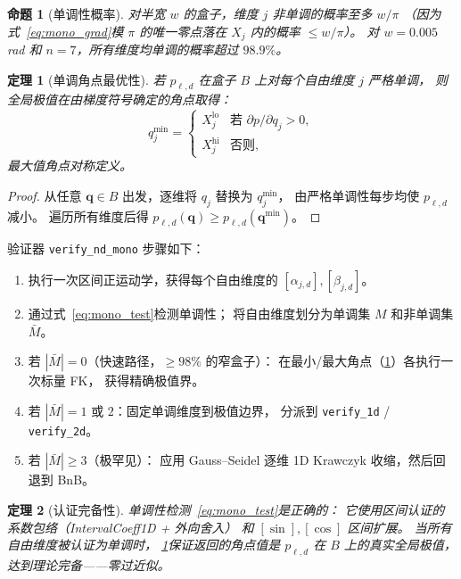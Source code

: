 \documentclass[journal]{IEEEtran}
\newtheorem{theorem}{定理}
\newtheorem{proposition}{命题}
\begin{document}
\begin{proposition}[单调性概率]\label{prop:mono_prob}
对半宽 $w$ 的盒子，维度 $j$ 非单调的概率至多 $w/\pi$
（因为式~\eqref{eq:mono_grad}模 $\pi$ 的唯一零点落在 $X_j$ 内的概率 $\leq w/\pi$）。
对 $w = 0.005$\,rad 和 $n = 7$，所有维度均单调的概率超过 $98.9\%$。
\end{proposition}

\begin{theorem}[单调角点最优性]\label{thm:mono_corner}
若 $p_{\ell,d}$ 在盒子 $B$ 上对每个自由维度 $j$ 严格单调，
则全局极值在由梯度符号确定的角点取得：
\begin{equation}\label{eq:corner}
  q_j^{\min} = \begin{cases}
    X_j^{\mathrm{lo}} & \text{若 } \partial p/\partial q_j > 0, \\
    X_j^{\mathrm{hi}} & \text{否则},
  \end{cases}
\end{equation}
最大值角点对称定义。
\end{theorem}
\begin{proof}
从任意 $\bm{q} \in B$ 出发，逐维将 $q_j$ 替换为 $q_j^{\min}$，
由严格单调性每步均使 $p_{\ell,d}$ 减小。
遍历所有维度后得 $p_{\ell,d}(\bm{q}) \geq p_{\ell,d}(\bm{q}^{\min})$。
\end{proof}

验证器 \texttt{verify\_nd\_mono} 步骤如下：
\begin{enumerate}
  \item 执行一次区间正运动学，获得每个自由维度的
    $[\alpha_{j,d}], [\beta_{j,d}]$。
  \item 通过式~\eqref{eq:mono_test}检测单调性；
    将自由维度划分为单调集 $M$ 和非单调集 $\bar{M}$。
  \item 若 $|\bar{M}| = 0$（快速路径，$\geq 98\%$ 的窄盒子）：
    在最小/最大角点（\cref{thm:mono_corner}）各执行一次标量 FK，
    获得精确极值界。
  \item 若 $|\bar{M}| = 1$ 或 $2$：固定单调维度到极值边界，
    分派到 \texttt{verify\_1d} / \texttt{verify\_2d}。
  \item 若 $|\bar{M}| \geq 3$（极罕见）：
    应用 Gauss--Seidel 逐维 1D Krawczyk 收缩，然后回退到 BnB。
\end{enumerate}

\begin{theorem}[认证完备性]\label{thm:cert_complete}
单调性检测~\eqref{eq:mono_test}是正确的：
它使用区间认证的系数包络（IntervalCoeff1D + 外向舍入）
和 $[\sin],[\cos]$ 区间扩展。
当所有自由维度被认证为单调时，
\cref{thm:mono_corner}保证返回的角点值是 $p_{\ell,d}$
在 $B$ 上的真实全局极值，达到理论完备——零过近似。
\end{theorem}
\end{document}
